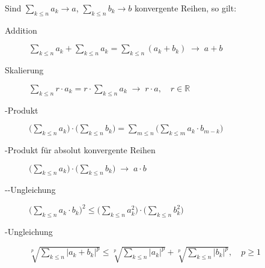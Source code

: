 Sind $\sum_{k \leq n} a_k \to a$, $\sum_{k \leq n} b_k \to b$ konvergente Reihen, so gilt:
\begin{description}
  \item [Addition] 
	$\sum_{k \leq n} a_k + \sum_{k \leq n} a_k = \sum_{k \leq n} (a_k+b_k) \;\to\; a+b$
  \item [Skalierung] 
	$\sum_{k \leq n} r \cdot a_k = r \cdot \sum_{k \leq n} a_k \;\to\; r \cdot a, \quad r\in\mathbb{R}$
  \item [-Produkt] \label{Cauchy-Produkt}
	$\bigl(\sum_{k \leq n} a_k\bigr) \cdot \bigl(\sum_{k \leq n} b_k\bigr)
	  = \sum_{m \leq n} \bigl( \sum_{k \leq m} a_k \cdot b_{m-k} \bigr)$
  \item [-Produkt für absolut konvergente Reihen]
	$\bigl(\sum_{k \leq n} a_k\bigr) \cdot \bigl(\sum_{k \leq n} b_k\bigr) \;\to\; a \cdot b$
  \item [--Ungleichung] 
	$\bigl(\sum_{k \leq n} a_k \cdot b_k\bigr)^2
        \leq \bigl(\sum_{k \leq n} a_k^2\bigr) \cdot \bigl(\sum_{k \leq n} b_k^2\bigr)$
  \item [-Ungleichung] 
	$\sqrt[p]{\sum_{k \leq n} \lvert a_k + b_k \rvert^p}
        \leq \sqrt[p]{\sum_{k \leq n} \lvert a_k \rvert^p} + \sqrt[p]{\sum_{k \leq n} \lvert b_k \rvert^p}, \quad p \geq 1$
\end{description}

